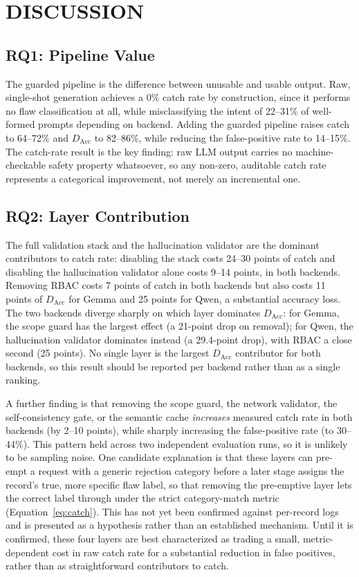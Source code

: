 \documentclass[a4paper,twoside]{article}
\begin{document}
\section{\uppercase{Discussion}}
\label{sec:discussion}

\subsection{RQ1: Pipeline Value}

\noindent The guarded pipeline is the difference between unusable and usable output. Raw, single-shot generation achieves a 0\% catch rate by construction, since it performs no flaw classification at all, while misclassifying the intent of 22--31\% of well-formed prompts depending on backend. Adding the guarded pipeline raises catch to 64--72\% and $D_{\mathrm{Acc}}$ to 82--86\%, while reducing the false-positive rate to 14--15\%. The catch-rate result is the key finding: raw LLM output carries no machine-checkable safety property whatsoever, so any non-zero, auditable catch rate represents a categorical improvement, not merely an incremental one.

\subsection{RQ2: Layer Contribution}

\noindent The full validation stack and the hallucination validator are the dominant contributors to catch rate: disabling the stack costs 24--30 points of catch and disabling the hallucination validator alone costs 9--14 points, in both backends. Removing RBAC costs 7 points of catch in both backends but also costs 11 points of $D_{\mathrm{Acc}}$ for Gemma and 25 points for Qwen, a substantial accuracy loss. The two backends diverge sharply on which layer dominates $D_{\mathrm{Acc}}$: for Gemma, the scope guard has the largest effect (a 21-point drop on removal); for Qwen, the hallucination validator dominates instead (a 29.4-point drop), with RBAC a close second (25 points). No single layer is the largest $D_{\mathrm{Acc}}$ contributor for both backends, so this result should be reported per backend rather than as a single ranking.

A further finding is that removing the scope guard, the network validator, the self-consistency gate, or the semantic cache \emph{increases} measured catch rate in both backends (by 2--10 points), while sharply increasing the false-positive rate (to 30--44\%). This pattern held across two independent evaluation runs, so it is unlikely to be sampling noise. One candidate explanation is that these layers can pre-empt a request with a generic rejection category before a later stage assigns the record's true, more specific flaw label, so that removing the pre-emptive layer lets the correct label through under the strict category-match metric (Equation~\ref{eq:catch}). This has not yet been confirmed against per-record logs and is presented as a hypothesis rather than an established mechanism. Until it is confirmed, these four layers are best characterized as trading a small, metric-dependent cost in raw catch rate for a substantial reduction in false positives, rather than as straightforward contributors to catch.
\end{document}
